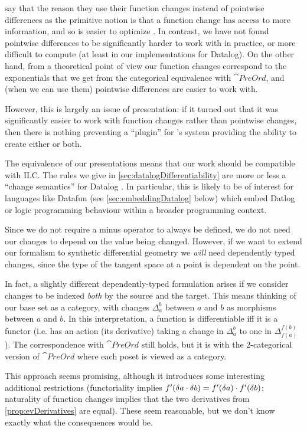 \citeauthor{cai2014changes} say that the reason they use their function changes instead of pointwise
differences as the primitive notion is that a function change has access to more
information, and so is easier to optimize \autocite[][section
2.2]{cai2014changes}. In contrast, we have not found pointwise differences to be
significantly harder to work with in practice, or more difficult to compute (at least in our implementations
for Datalog). On the other hand, from a theoretical point of view our function changes correspond to the
exponentials that we get from the categorical equivalence with $\cat{PreOrd}$,
and (when we can use them) pointwise differences are easier to work with.

However, this is largely an issue of presentation: if it turned out that it was
significantly easier to work with function changes rather than pointwise
changes, then there is nothing preventing a ``plugin'' for \citeauthor{cai2014changes}'s system providing the
ability to create either or both.

The equivalence of our presentations means that our work should be compatible
with ILC. The rules we give in \cref{sec:datalogDifferentiability} are more or
less a ``change semantics'' for Datalog \autocite[See][section
3.5]{cai2014changes}. In particular, this is likely to be of interest for languages like
Datafun (see \cref{sec:embeddingDatalog} below) which embed Datlog or logic programming behaviour within a broader
programming context.

Since we do not require a minus operator to always be defined, we do not need
our changes to depend on the value being changed. However,
if we want to extend our formalism to synthetic differential geometry we \emph{will} need
dependently typed changes, since the type of the tangent space at a point is
dependent on the point.

In fact, a slightly different dependently-typed formulation arises if we consider changes
to be indexed \emph{both} by the source and the target. This means
thinking of our base set as a category, with changes $\Delta_a^b$ between $a$
and $b$ as morphisms between $a$ and $b$. In this interpretation, a function is
differentiable iff it is a functor (i.e. has an action (its derivative) taking a
change in $\Delta_a^b$ to one in $\Delta_{f(a)}^{f(b)}$). The correspondence
with $\cat{PreOrd}$ still holds, but it is with the 2-categorical version of
$\cat{PreOrd}$ where each poset is viewed as a category.

This approach seems promising, although it introduces some
interesting additional restrictions (functoriality implies $f'(\delta a \cdot \delta b) =
f'(\delta a) \cdot f'(\delta b)$; naturality of function
changes implies that the two derivatives from \cref{prop:evDerivatives} are equal). These seem
reasonable, but we don't know exactly what the consequences would be.

